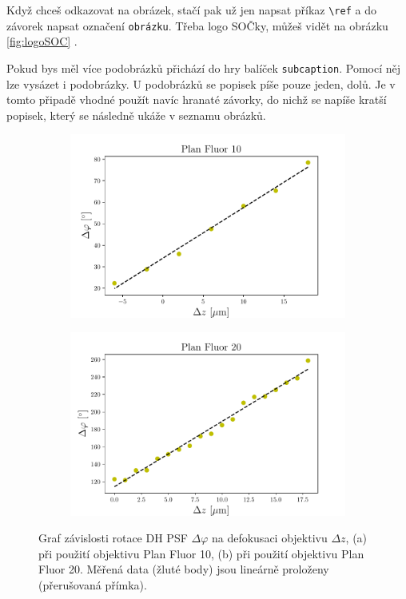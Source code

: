 \documentclass[12pt, a4paper,
 twoside,        %
 openright
]{report}
\begin{document}
Když chceš odkazovat na obrázek, stačí pak už jen napsat příkaz \verb|\ref| a do závorek napsat označení \texttt{obrázku}. Třeba logo SOČky, můžeš vidět na obrázku \ref{fig:logoSOC} \cite{socLogo}.

Pokud bys měl více podobrázků přichází do hry balíček \texttt{subcaption}. Pomocí něj lze vysázet i podobrázky. U podobrázků se popisek píše pouze jeden, dolů. Je v tomto připadě vhodné použít navíc hranaté závorky, do nichž se napíše kratší popisek, který se následně ukáže v seznamu obrázků.



\begin{figure}[h] \centering
    \begin{subfigure}{0.6\textwidth} %
      \includegraphics[width=\textwidth]{imgs/vysledek_10} 
      \caption{}
    \end{subfigure}
    \begin{subfigure}{0.6\textwidth}
      \includegraphics[width=\textwidth]{imgs/vysledek_20}
      \caption{}
    \end{subfigure}
    \caption[Graf závislosti rotace DH PSF $\Delta\varphi$ na defokusaci objektivu $\Delta z$.]{Graf závislosti rotace DH PSF $\Delta\varphi$ na defokusaci objektivu $\Delta z$, (a) při použití objektivu Plan Fluor 10, (b) při použití objektivu Plan Fluor 20. Měřená data (žluté body) jsou lineárně proloženy (přerušovaná přímka). }
    \label{fig:rotace_grafy}
\end{figure}
\end{document}
